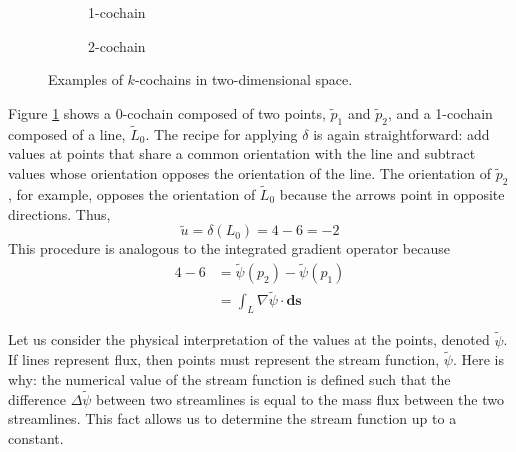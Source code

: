 \begin{figure}[ht]
\begin{subfigure}[c]{0.3\textwidth}
{
            \vfill
        }
        \caption{1-cochain}
        \label{fig:outer1CochainExample}
    \end{subfigure}
    \begin{subfigure}[c]{0.3\textwidth}
        \centering
        \usebox{\boxOuterExample}
        \caption{2-cochain}
        \label{fig:outer2CochainExample}
    \end{subfigure}
    \caption{Examples of $k$-cochains in two-dimensional space.}
    \label{fig:outerCochainExamples}
\end{figure}

Figure \ref{fig:outer1CochainExample} shows a 0-cochain composed of two points, $\tilde{p}_1$ and $\tilde{p}_2$, and a 1-cochain composed of a line, $\tilde{L}_0$. The recipe for applying $\delta$ is again  straightforward: add values at points that share a common orientation with the line and subtract values whose orientation opposes the orientation of the line. The orientation of $\tilde{p}_2$, for example, opposes the orientation of $\tilde{L}_0$ because the arrows point in opposite directions. Thus,
\begin{equation}
    \tilde{u} = \delta(L_0) = 4 - 6 = -2
\end{equation}
This procedure is analogous to the integrated gradient operator because
\begin{equation}
    \begin{split}
        4 - 6 &= \tilde{\psi}(p_2) - \tilde{\psi}(p_1) \\
        &= \int_{L} \nabla \tilde{\psi} \cdot \mathbf{ds}
    \end{split}
\end{equation}

Let us consider the physical interpretation of the values at the points, denoted $\tilde{\psi}$. If lines represent flux, then points must represent the stream function, $\tilde{\psi}$. Here is why: the numerical value of the stream function is defined such that the difference $\Delta \tilde{\psi}$ between two streamlines is equal to the mass flux between the two streamlines. This fact allows us to determine the stream function up to a constant.

